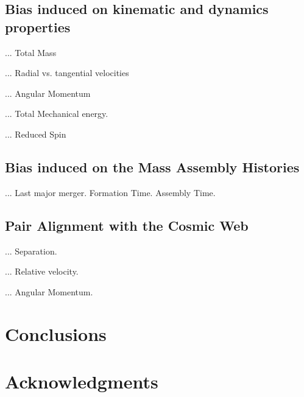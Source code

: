 \documentclass[usenatbib]{latex/mn2e}
\begin{document}
\subsection{Bias induced on kinematic and dynamics properties}
\label{subsec:bias_kinematic}

... Total Mass

... Radial vs. tangential velocities

... Angular Momentum

... Total Mechanical energy.

... Reduced Spin


\subsection{Bias induced on the Mass Assembly Histories}
\label{subsec:bias_MAH}

... Last major merger. Formation Time. Assembly Time.

\subsection{Pair Alignment with the Cosmic Web}
\label{subsec:alignment_cosmic_web}

... Separation.

... Relative velocity.

... Angular Momentum.


\section{Conclusions}
\label{sec:conclusions}


\section*{Acknowledgments}  
\end{document}

